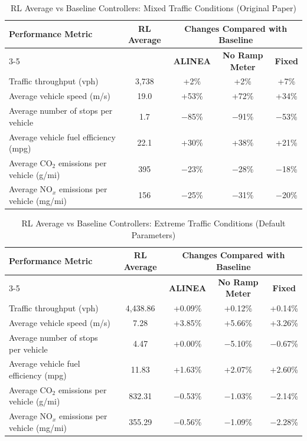 \begin{table}[H]
\centering
\small
\caption{RL Average vs Baseline Controllers: Mixed Traffic Conditions (Original Paper)}
\begin{tabular}{l c c c c}
\toprule
\multirow{2}{*}{\textbf{Performance Metric}} & \multirow{2}{*}{\textbf{RL Average}} & \multicolumn{3}{c}{\textbf{Changes Compared with Baseline}} \\
\cmidrule(lr){3-5}
 & & \textbf{ALINEA} & \textbf{No Ramp Meter} & \textbf{Fixed} \\
\midrule
Traffic throughput (vph)                      & 3{,}738 & +2\%   & +2\%   & +7\%   \\
Average vehicle speed (m/s)                   & 19.0    & +53\%  & +72\%  & +34\%  \\
Average number of stops per vehicle           & 1.7     & $-$85\% & $-$91\% & $-$53\% \\
Average vehicle fuel efficiency (mpg)         & 22.1    & +30\%  & +38\%  & +21\%  \\
Average CO$_2$ emissions per vehicle (g/mi)   & 395     & $-$23\% & $-$28\% & $-$18\% \\
Average NO$_x$ emissions per vehicle (mg/mi)  & 156     & $-$25\% & $-$31\% & $-$20\% \\
\bottomrule
\end{tabular}
\end{table}

\begin{table}[H]
\centering
\small
\caption{RL Average vs Baseline Controllers: Extreme Traffic Conditions (Default Parameters)}
\begin{tabular}{l c c c c}
\toprule
\multirow{2}{*}{\textbf{Performance Metric}} & \multirow{2}{*}{\textbf{RL Average}} & \multicolumn{3}{c}{\textbf{Changes Compared with Baseline}} \\
\cmidrule(lr){3-5}
 & & \textbf{ALINEA} & \textbf{No Ramp Meter} & \textbf{Fixed} \\
\midrule
Traffic throughput (vph)                      & 4{,}438.86 & +0.09\%    & +0.12\%   & +0.14\%   \\
Average vehicle speed (m/s)                   & 7.28       & +3.85\%    & +5.66\%   & +3.26\%   \\
Average number of stops per vehicle           & 4.47       & +0.00\%    & $-$5.10\% & $-$0.67\% \\
Average vehicle fuel efficiency (mpg)         & 11.83      & +1.63\%    & +2.07\%   & +2.60\%   \\
Average CO$_2$ emissions per vehicle (g/mi)   & 832.31     & $-$0.53\%  & $-$1.03\% & $-$2.14\% \\
Average NO$_x$ emissions per vehicle (mg/mi)  & 355.29     & $-$0.56\%  & $-$1.09\% & $-$2.28\% \\
\bottomrule
\end{tabular}
\end{table}

